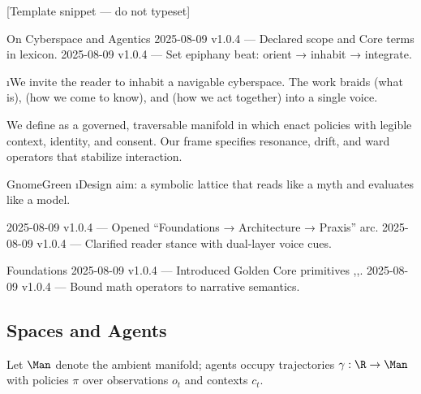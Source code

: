 [Template snippet — do not typeset]

\begin{SectionHeaderLedger}{On Cyberspace and Agentics}
 2025-08-09 v1.0.4 — Declared scope and Core terms in lexicon.
  2025-08-09 v1.0.4 — Set epiphany beat: orient → inhabit → integrate.
\end{SectionHeaderLedger}

\i{We invite the reader to inhabit a navigable cyberspace}. The work braids  (what is),  (how we come to know), and  (how we act together) into a single voice.

We define  as a governed, traversable manifold in which  enact policies with legible context, identity, and consent. Our  frame specifies resonance, drift, and ward operators that stabilize interaction.

\begin{callout}[Thesis]{GnomeGreen}
\i{Design aim}: a symbolic lattice that reads like a myth and evaluates like a model.
\end{callout}

\begin{SectionFooterLedger}
   2025-08-09 v1.0.4 — Opened “Foundations → Architecture → Praxis” arc.
 2025-08-09 v1.0.4 — Clarified reader stance with dual-layer voice cues.
\end{SectionFooterLedger}



\begin{SectionHeaderLedger}{Foundations}
  2025-08-09 v1.0.4 — Introduced Golden Core primitives \Res,\Drift,\Ward.
   2025-08-09 v1.0.4 — Bound math operators to narrative semantics.
\end{SectionHeaderLedger}

\subsection*{Spaces and Agents}
Let $\Man$ denote the ambient manifold; agents occupy trajectories $\gamma : \R \to \Man$ with policies $\pi$ over observations $o_t$ and contexts $c_t$.

